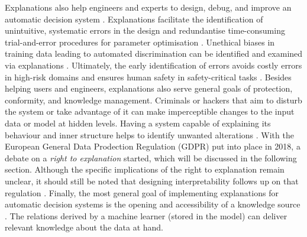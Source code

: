 Explanations also help engineers and experts to design, debug, and improve an automatic decision system \cite{preece2018asking}. Explanations facilitate the identification of unintuitive, systematic errors \cite{gilpin2018explaining} \cite{ribeiro2016should} in the design and redundantise time-consuming trial-and-error procedures for parameter optimisation \cite{liu2017towards}. Unethical biases in training data leading to automated discrimination \cite{diakopoulos2016accountability} can be identified and examined via explanations \cite{gilpin2018explaining} \cite{richardson2018survey} \cite{ribeiro2016should}. Ultimately, the early identification of errors avoids costly errors in high-risk domains \cite{diakopoulos2016accountability} \cite{bibal2016interpretability} \cite{van2018contrastive} and ensures human safety in safety-critical tasks \cite{gilpin2018explaining} \cite{richardson2018survey}.\newline
Besides helping users and engineers, explanations also serve general goals of protection, conformity, and knowledge management. Criminals or hackers that aim to disturb the system or take advantage of it can make imperceptible changes to the input data or model at hidden levels. Having a system capable of explaining its behaviour and inner structure helps to identify unwanted alterations \cite{gilpin2018explaining}. With the European General Data Prodection Regulation (GDPR) put into place in 2018, a debate on a \textit{right to explanation} started, which will be discussed in the following section. Although the specific implications of the right to explanation remain unclear, it should still be noted that designing interpretability follows up on that regulation \cite{goodman16eu} \cite{gilpin2018explaining} \cite{bibal2016interpretability}. Finally, the most general goal of implementing explanations for automatic decision systems is the opening and accessibility of a knowledge source \cite{bibal2016interpretability} \cite{richardson2018survey}. The relations derived by a machine learner (stored in the model) can deliver relevant knowledge about the data at hand.\newline


